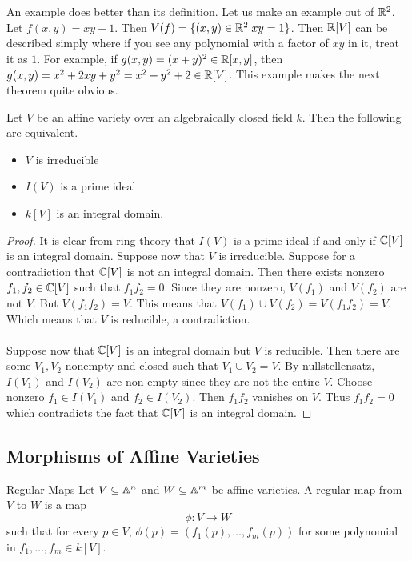 \documentclass[a4paper]{article}
\begin{document}
An example does better than its definition. Let us make an example out of $\mathbb{R}^2$. Let $f(x,y)=xy-1$. Then $V(f)=\{(x,y)\in\mathbb{R}^2|xy=1\}$. Then $\mathbb{R}[V]$ can be described simply where if you see any polynomial with a factor of $xy$ in it, treat it as $1$. For example, if $g(x,y)=(x+y)^2\in\mathbb{R}[x,y]$, then $g(x,y)=x^2+2xy+y^2=x^2+y^2+2\in\mathbb{R}[V]$. This example makes the next theorem quite obvious. 

\begin{prp}{}{} Let $V$ be an affine variety over an algebraically closed field $k$. Then the following are equivalent. 
\begin{itemize}
\item $V$ is irreducible
\item $I(V)$ is a prime ideal
\item $k[V]$ is an integral domain. 
\end{itemize}\tcbline
\begin{proof}
It is clear from ring theory that $I(V)$ is a prime ideal if and only if $\mathbb{C}[V]$ is an integral domain. Suppose now that $V$ is irreducible. Suppose for a contradiction that $\mathbb{C}[V]$ is not an integral domain. Then there exists nonzero $f_1,f_2\in\mathbb{C}[V]$ such that $f_1f_2=0$. Since they are nonzero, $V(f_1)$ and $V(f_2)$ are not $V$. But $V(f_1f_2)=V$. This means that $V(f_1)\cup V(f_2)=V(f_1f_2)=V$. Which means that $V$ is reducible, a contradiction. \\~\\
Suppose now that $\mathbb{C}[V]$ is an integral domain but $V$ is reducible. Then there are some $V_1,V_2$ nonempty and closed such that $V_1\cup V_2=V$. By nullstellensatz, $I(V_1)$ and $I(V_2)$ are non empty since they are not the entire $V$. Choose nonzero $f_1\in I(V_1)$ and $f_2\in I(V_2)$. Then $f_1f_2$ vanishes on $V$. Thus $f_1f_2=0$ which contradicts the fact that $\mathbb{C}[V]$ is an integral domain. 
\end{proof}
\end{prp}

\subsection{Morphisms of Affine Varieties}
\begin{defn}{Regular Maps}{} Let $V\subseteq\mathbb{A}^n$ and $W\subseteq\mathbb{A}^m$ be affine varieties. A regular map from $V$ to $W$ is a map $$\phi:V\to W$$ such that for every $p\in V$, $\phi(p)=(f_1(p),\dots,f_m(p))$ for some polynomial in $f_1,\dots,f_m\in k[V]$. 
\end{defn}
\end{document}
